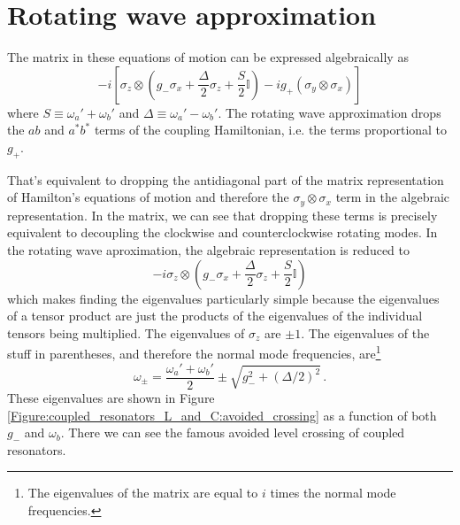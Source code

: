 \documentclass{article}
\begin{document}
\section{Rotating wave approximation}

The matrix in these equations of motion can be expressed algebraically as
\begin{equation}
  -i \left[
    \sigma_z \otimes
      \left(
        g_- \sigma_x + \frac{\Delta}{2} \sigma_z + \frac{S}{2} \mathbb{I}
      \right)
    -i g_+ (\sigma_y \otimes \sigma_x)
  \right]
\end{equation}
where $S \equiv \omega_a' + \omega_b'$ and $\Delta \equiv \omega_a' - \omega_b'$.
The rotating wave approximation drops the $ab$ and $a^* b^*$ terms of the coupling Hamiltonian, i.e. the terms proportional to $g_+$.

That's equivalent to dropping the antidiagonal part of the matrix representation of Hamilton's equations of motion and therefore the $\sigma_y \otimes \sigma_x$ term in the algebraic representation.
In the matrix, we can see that dropping these terms is precisely equivalent to decoupling the clockwise and counterclockwise rotating modes.
In the rotating wave aproximation, the algebraic representation is reduced to
\begin{equation*}
  -i \sigma_z \otimes \left(
    g_- \sigma_x + \frac{\Delta}{2} \sigma_z + \frac{S}{2} \mathbb{I}
  \right)
\end{equation*}
which makes finding the eigenvalues particularly simple because the eigenvalues of a tensor product are just the products of the eigenvalues of the individual tensors being multiplied.
The eigenvalues of $\sigma_z$ are $\pm 1$.
The eigenvalues of the stuff in parentheses, and therefore the normal mode frequencies, are\footnote{The eigenvalues of the matrix are equal to $i$ times the normal mode frequencies.}
\begin{equation}
  \omega_\pm
  = \frac{\omega_a' + \omega_b'}{2} \pm \sqrt{g_-^2 + (\Delta / 2)^2 } \, .
\end{equation}
These eigenvalues are shown in Figure \ref{Figure:coupled_resonators_L_and_C:avoided_crossing} as a function of both $g_-$ and $\omega_b$.
There we can see the famous avoided level crossing of coupled resonators.
\end{document}
